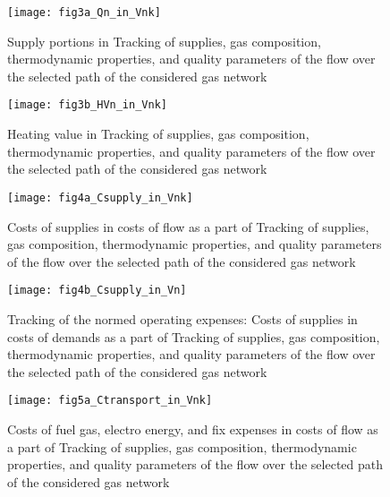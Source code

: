 \documentclass{article}
\begin{document}
\bigskip \bigskip

\begin{figure}[tbp]
\hspace{10cm} \centering\texttt{[image: fig3a\_Qn\_in\_Vnk]}\newline
\caption{Supply portions in Tracking of supplies, gas composition,
thermodynamic properties, and quality parameters of the flow over the
selected path of the considered gas network}
\label{fig:3a}
\end{figure}

\bigskip

\bigskip

\begin{figure}[tbp]
\hspace{10cm} \centering\texttt{[image: fig3b\_HVn\_in\_Vnk]}\newline
\caption{Heating value in Tracking of supplies, gas composition,
thermodynamic properties, and quality parameters of the flow over the
selected path of the considered gas network}
\label{fig:3b}
\end{figure}

\bigskip 
\begin{figure}[tbp]
\hspace{10cm} \centering\texttt{[image: fig4a\_Csupply\_in\_Vnk]}\newline
\caption{Costs of supplies in costs of flow as a part of Tracking of
supplies, gas composition, thermodynamic properties, and quality parameters
of the flow over the selected path of the considered gas network}
\label{fig:4a}
\end{figure}

\bigskip

\begin{figure}[tbp]
\hspace{10cm} \centering\texttt{[image: fig4b\_Csupply\_in\_Vn]}\newline
\caption{Tracking of the normed operating expenses: Costs of supplies in
costs of demands as a part of Tracking of supplies, gas composition,
thermodynamic properties, and quality parameters of the flow over the
selected path of the considered gas network}
\label{fig:4b}
\end{figure}

\bigskip

\begin{figure}[tbp]
\hspace{10cm} \centering\texttt{[image: fig5a\_Ctransport\_in\_Vnk]}\newline
\caption{Costs of fuel gas, electro energy, and fix expenses in costs of
flow as a part of Tracking of supplies, gas composition, thermodynamic
properties, and quality parameters of the flow over the selected path of the
considered gas network}
\label{fig:5a}
\end{figure}
\end{document}
